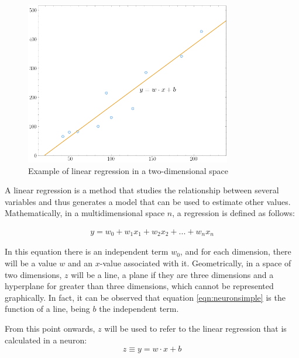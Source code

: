 \begin{figure}[H]
    \centering
    \includegraphics[width=9cm]{images/state-of-art/regression/regression.png}
    \caption{Example of linear regression in a two-dimensional space}
    \label{fig:regression}
\end{figure}

A linear regression is a method that studies the relationship between several variables and thus generates a model that can be used to estimate other values. Mathematically, in a multidimensional space $n$, a regression is defined as follows:


\begin{eqnarray}
  y = w_0 + w_1x_1 + w_2x_2 + ... + w_nx_n
  \label{linealregression}
\end{eqnarray}


In this equation there is an independent term $w_0$, and for each dimension, there will be a value $w$ and an $x$-value associated with it. Geometrically, in a space of two dimensions, $z$ will be a line, a plane if they are three dimensions and a hyperplane for greater than three dimensions, which cannot be represented graphically. In fact, it can be observed that equation \ref{eqn:neuronsimple} is the function of a line, being $b$  the independent term.
\newline

From this point onwards, $z$ will be used to refer to the linear regression that is calculated in a neuron:
\begin{equation}
  z \equiv y = w \cdot x + b
  \label{eqn:z_equation_init}
\end{equation}



